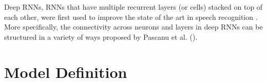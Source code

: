 \documentclass{article}
\begin{document}
Deep RNNs, RNNs that have multiple recurrent layers (or cells) stacked on top of each other, were first used to improve the state of the art in speech recognition \cite{graves2013speech}. More specifically, the connectivity across neurons and layers in deep RNNs can be structured in a variety of ways proposed by Pascanu et al. (\citeyear{pascanu2013construct}).



\section{Model Definition}
\end{document}
